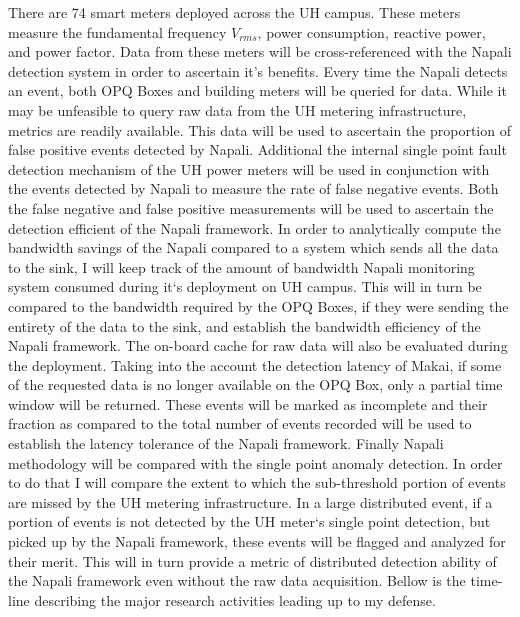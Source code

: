 There are 74 smart meters deployed across the UH campus. These meters measure the fundamental frequency $V_{rms}$, power consumption, reactive power, and power factor. Data from these meters will be cross-referenced with the Napali detection system in order to ascertain it's benefits. Every time the Napali detects an event, both OPQ Boxes and building meters will be queried for data. While it may be unfeasible to query raw data from the UH metering infrastructure, metrics are readily available. This data will be used to ascertain the proportion of false positive events detected by Napali. Additional the internal single point fault detection mechanism of the UH power meters will be used in conjunction with the events detected by Napali to measure the rate of false negative events. Both the false negative and false positive measurements will be used to ascertain the detection efficient of the Napali framework. In order to analytically compute the bandwidth savings of the Napali compared to a system which sends all the data to the sink, I will keep track of the amount of bandwidth Napali monitoring system consumed during it`s deployment on UH campus. This will in turn be compared to the bandwidth required by the OPQ Boxes, if they were sending the entirety of the data to the sink, and establish the bandwidth efficiency of the Napali framework. The on-board cache for raw data will also be evaluated during the deployment. Taking into the account the detection latency of Makai, if some of the requested data is no longer available on the OPQ Box, only a partial time window will be returned. These events will be marked as incomplete and their fraction as compared to the total number of events recorded will be used to establish the latency tolerance of the Napali framework. Finally Napali methodology will be compared with the single point anomaly detection. In order to do that I will compare the extent to which the sub-threshold portion of events are missed by the UH metering infrastructure. In a large distributed event, if a portion of events is not detected by the UH meter`s single point detection, but picked up by the Napali framework, these events will be flagged and analyzed for their merit. This will in turn provide a metric of distributed detection ability of the Napali framework even without the raw data acquisition. Bellow is the time-line describing the major research activities leading up to my defense.


